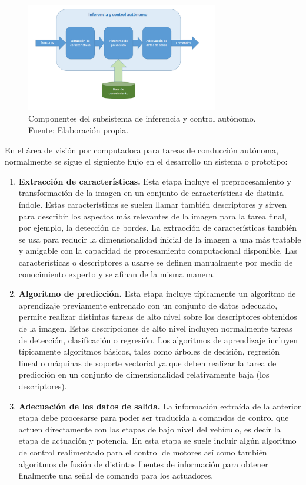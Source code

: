 \begin{figure}[!h] 
    \centering
    \includegraphics[width=0.75\textwidth]{img/inferencia}
    \caption{Componentes del subsistema de inferencia y control autónomo. Fuente: Elaboración propia.}
    \label{fig:inferencia}
\end{figure}


En el área de visión por computadora para tareas de conducción autónoma, normalmente se sigue el siguiente 
flujo en el desarrollo un sistema o prototipo:

\begin{enumerate}
    \item \textbf{Extracción de características.} Esta etapa incluye el preprocesamiento y transformación de la imagen 
    en un conjunto de características de distinta índole. Estas características se suelen llamar también descriptores 
    y sirven para describir los aspectos más relevantes de la imagen para la tarea final, por ejemplo, la detección de bordes. 
    La extracción de características también se usa para reducir la dimensionalidad inicial de la imagen a una más tratable y 
    amigable con la capacidad de procesamiento computacional disponible. Las características o descriptores a usarse 
    se definen manualmente por medio de conocimiento experto y se afinan de la misma manera.

    \item \textbf{Algoritmo de predicción.} Esta etapa incluye típicamente un algoritmo de aprendizaje previamente 
    entrenado con un conjunto de datos adecuado, permite realizar distintas tareas de alto nivel sobre los descriptores 
    obtenidos de la imagen. Estas descripciones de alto nivel incluyen normalmente tareas de detección, 
    clasificación o regresión. Los algoritmos de aprendizaje incluyen típicamente algoritmos básicos, tales como árboles de decisión,
    regresión lineal o máquinas de soporte vectorial ya que deben realizar la tarea de predicción en un 
    conjunto de dimensionalidad relativamente baja (los descriptores).

    \item \textbf{Adecuación de los datos de salida.} La información extraída de la anterior etapa debe 
    procesarse para poder ser traducida a comandos de control que actuen directamente con las etapas 
    de bajo nivel del vehículo, es decir la etapa de actuación y potencia. En esta etapa se suele incluir algún algoritmo 
    de control realimentado para el control de motores así como también algoritmos de fusión de distintas fuentes de información
    para obtener finalmente una señal de comando para los actuadores.
\end{enumerate}

